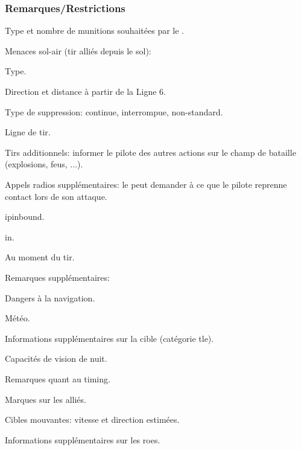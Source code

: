 \subsubsection{Remarques/Restrictions}%
	
\begin{e1}
	
	
	\begin{e2}
		
		\item Type et nombre de munitions souhaitées par le \ja{}.
		
		\item Menaces sol-air (tir alliés depuis le sol):
		
		\begin{e3}
			
			\item Type.
			\item Direction et distance à partir de la Ligne 6.
			\item Type de suppression: continue, interrompue, non-standard.
			\item Ligne de tir.
			
		\end{e3}
		
		\item Tirs additionnels: informer le pilote des autres actions sur le champ de bataille (explosions, feus, ...).
		
		\item Appels radios supplémentaires: le \ja{} peut demander à ce que le pilote reprenne contact lors de son attaque.
		
		\begin{e3}
			
			\item \gls{ipinbound}.
			\item \gls{in}.
			\item Au moment du tir.
			
		\end{e3}
		
		\item Remarques supplémentaires:
		
		\begin{e3}
			
			\item Dangers à la navigation.
			\item Météo.
			\item Informations supplémentaires sur la cible (catégorie \gls{tle}).
			\item Capacités de vision de nuit.
			\item Remarques quant au timing.
			\item Marques sur les alliés.
			\item Cibles mouvantes: vitesse et direction estimées.
			\item Informations supplémentaires sur les \glspl{roe}.
			

\end{e3}
\end{e2}
\end{e1}
